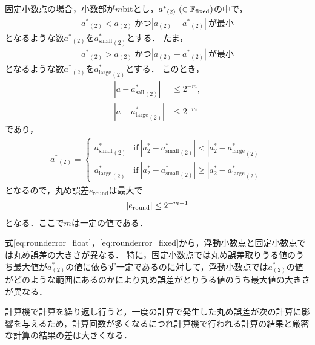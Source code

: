 固定小数点の場合，小数部が$m$bitとし，${a^{\ast}}_{(2)} \ (\in\mathbb{F}_{\text{fixed}})$の中で，
\begin{align*}
    {a^{\ast}}_{(2)} < a_{(2)}\ \text{かつ} |a_{(2)} - {a^{\ast}}_{(2)}| \ \text{が最小}
\end{align*}
となるような数${a^{\ast}}_{(2)}$を${a^{\ast}_{\mathrm{small}}}_{(2)}$とする．
たま，
\begin{align*}
    {a^{\ast}}_{(2)} > a_{(2)} \ \text{かつ} |a_{(2)} - {a^{\ast}}_{(2)}| \ \text{が最小}
\end{align*}
となるような数${a^{\ast}}_{(2)}$を${a^{\ast}_{\mathrm{large}}}_{(2)}$とする．
このとき，
\begin{align}
    |a - {a^{\ast}_{\mathrm{sall}}}_{(2)}| &\leq 2^{-m}, \\
    |a - {a^{\ast}_{\mathrm{large}}}_{(2)}| &\leq 2^{-m}
\end{align}
であり，
\begin{align*}
    {a^{\ast}}_{(2)} = \left\{ 
        \begin{array}{ll}
            {a^{\ast}_{\mathrm{small}}}_{(2)} &\text{if} \ |a^{\ast}_{2} - {a^{\ast}_{\mathrm{small}}}_{(2)} | < |a^{\ast}_{2} - {a^{\ast}_{\mathrm{large}}}_{(2)} | \\
            {a^{\ast}_{\mathrm{large}}}_{(2)} &\text{if} \ |a^{\ast}_{2} - {a^{\ast}_{\mathrm{small}}}_{(2)} | \geq |a^{\ast}_{2} - {a^{\ast}_{\mathrm{large}}}_{(2)} | 
        \end{array}
    \right.
\end{align*}
となるので，丸め誤差$e_{\mathrm{round}}$は最大で
\begin{align}
    \label{eq:rounderror_fixed}
    |e_{\mathrm{round}}| \leq 2^{-m-1}
\end{align}
となる．ここで$m$は一定の値である．


式\eqref{eq:rounderror_float}，\eqref{eq:rounderror_fixed}から，浮動小数点と固定小数点では丸め誤差の大きさが異なる．
特に，固定小数点では丸め誤差取りうる値のうち最大値が$a^{\ast}_{(2)}$の値に依らず一定であるのに対して，浮動小数点では$a^{\ast}_{(2)}$の値がどのような範囲にあるのかにより丸め誤差がとりうる値のうち最大値の大きさが異なる．


計算機で計算を繰り返し行うと，一度の計算で発生した丸め誤差が次の計算に影響を与えるため，計算回数が多くなるにつれ計算機で行われる計算の結果と厳密な計算の結果の差は大きくなる．

